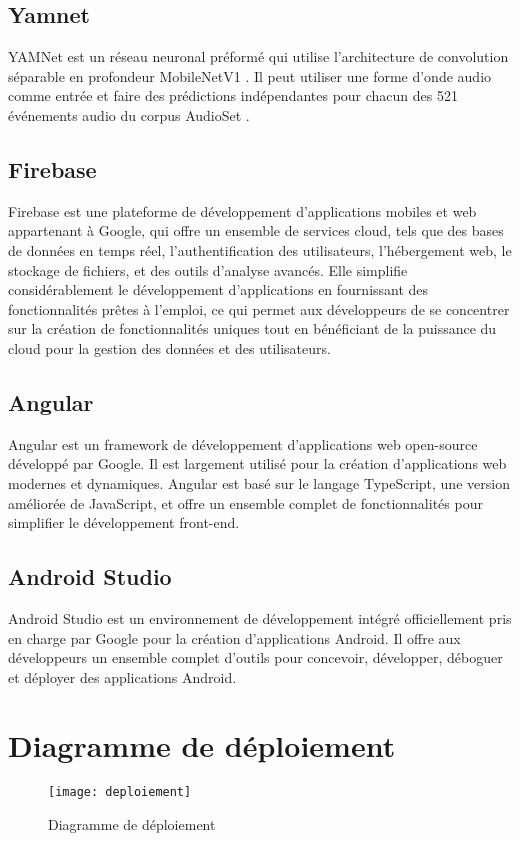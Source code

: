 \subsection{Yamnet}
YAMNet\cite{yamnet} est un réseau neuronal préformé qui utilise l'architecture de convolution séparable en profondeur MobileNetV1 \cite{andrew_g_howard_menglong_zhu_bo_chen_dmitry_kalenichenko_weijun_wang_tobias_weyand_marco_andreetto_hartwig_adam_mobilenets}. Il peut utiliser une forme d'onde audio comme entrée et faire des prédictions indépendantes pour chacun des 521 événements audio du corpus AudioSet \cite{dataset_large_scale}.

\subsection{Firebase}
Firebase est une plateforme de développement d'applications mobiles et web appartenant à Google, qui offre un ensemble de services cloud, tels que des bases de données en temps réel, l'authentification des utilisateurs, l'hébergement web, le stockage de fichiers, et des outils d'analyse avancés. Elle simplifie considérablement le développement d'applications en fournissant des fonctionnalités prêtes à l'emploi, ce qui permet aux développeurs de se concentrer sur la création de fonctionnalités uniques tout en bénéficiant de la puissance du cloud pour la gestion des données et des utilisateurs.

\subsection{Angular}
Angular est un framework de développement d'applications web open-source développé par Google. Il est largement utilisé pour la création d'applications web modernes et dynamiques. Angular est basé sur le langage TypeScript, une version améliorée de JavaScript, et offre un ensemble complet de fonctionnalités pour simplifier le développement front-end. 

\subsection{Android Studio}
Android Studio est un environnement de développement intégré officiellement pris en charge par Google pour la création d'applications Android. Il offre aux développeurs un ensemble complet d'outils pour concevoir, développer, déboguer et déployer des applications Android. 

\section{Diagramme de déploiement}
\begin{figure}[H]
	\centering
	\texttt{[image: deploiement]}
	\caption{Diagramme de déploiement}
\end{figure}

